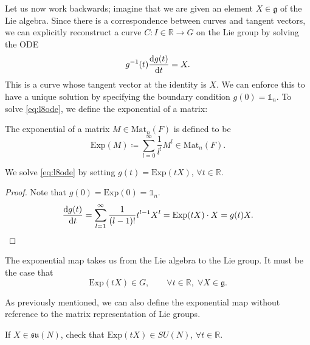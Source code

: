 \begin{wrapfigure}{R}{0.25\columnwidth}
  \centering
  \def\svgwidth{0.2\columnwidth}
  
  \caption{}
  \label{fig:l8f5}
\end{wrapfigure}
Let us now work backwards; imagine that we are given an element $X \in \mathfrak{g}$ of the Lie algebra.
Since there is a correspondence between curves and tangent vectors, we can explicitly reconstruct a curve $C \colon I \in \mathbb{R} \to G$ on the Lie group by solving the ODE
\begin{equation}
  \label{eq:l8ode}
  g^{-1}(t) \dv{g(t)}{t} = X.
\end{equation}
This is a curve whose tangent vector at the identity is $X$.
We can enforce this to have a unique solution by specifying the boundary condition $g(0) = \mathbb{1}_n$.
To solve \eqref{eq:l8ode}, we define the exponential of a matrix:
\begin{definition}[]
  The exponential of a matrix $M \in \text{Mat}_n(F)$ is defined to be
  \begin{equation}
    \text{Exp}(M) \coloneqq \sum_{l =0}^{\infty} \frac{1}{l^!} M^l \in \text{Mat}_n(F).
  \end{equation}
\end{definition}
\begin{claim}
  We solve \eqref{eq:l8ode} by setting $g(t) = \text{Exp}(t X)$, $\forall t \in \mathbb{R}.$
\end{claim}
\begin{proof}
  Note that $g(0) = \text{Exp}(0) = \mathbb{1}_n$.
  \begin{equation}
    \dv{g(t)}{t} = \sum_{l = 1}^\infty \frac{1}{(l-1)!} t^{l-1} X^l = \text{Exp}(t X) \cdot X = g(t) X.
  \end{equation}
\end{proof}
The exponential map takes us from the Lie algebra to the Lie group.
It must be the case that
\begin{equation}
  \text{Exp}(t X) \in G, \qquad \forall t \in \mathbb{R},\; \forall X \in \mathfrak{g}.
\end{equation}
\begin{leftbar}
  \begin{remark}
    As previously mentioned, we can also define the exponential map without reference to the matrix representation of Lie groups.
  \end{remark}
\end{leftbar}

\begin{exercise}
  If $X \in \mathfrak{su}(N)$, check that $\text{Exp}(t X) \in SU(N)$, $\forall t \in \mathbb{R}$.
\end{exercise}


